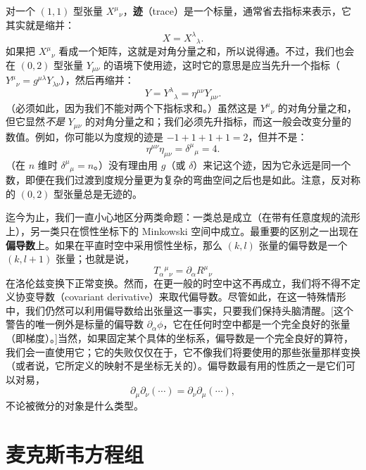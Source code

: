 对一个 $(1,1)$ 型张量 $X^{\mu}{}_{\nu}$，\textbf{迹}（trace）是一个标量，通常省去指标来表示，它其实就是缩并：
\begin{equation*}
X = X^{\lambda}{}_{\lambda}.
\tag{1.87}
\end{equation*}
如果把 $X^{\mu}{}_{\nu}$ 看成一个矩阵，这就是对角分量之和，所以说得通。不过，我们也会在 $(0,2)$ 型张量 $Y_{\mu\nu}$ 的语境下使用迹，这时它的意思是应当先升一个指标（$Y^{\mu}{}_{\nu} = g^{\mu\lambda}Y_{\lambda\nu}$），然后再缩并：
\begin{equation*}
Y = Y^{\lambda}{}_{\lambda} = \eta^{\mu\nu}Y_{\mu\nu}.
\tag{1.88}
\end{equation*}
（必须如此，因为我们不能对两个下指标求和。）虽然这是 $Y^{\mu}{}_{\nu}$ 的对角分量之和，但它显然\emph{不是} $Y_{\mu\nu}$ 的对角分量之和；我们必须先升指标，而这一般会改变分量的数值。例如，你可能以为度规的迹是 $-1+1+1+1=2$，但并不是：
\begin{equation*}
\eta^{\mu\nu}\eta_{\mu\nu} = \delta^{\mu}{}_{\mu} = 4.
\tag{1.89}
\end{equation*}
（在 $n$ 维时 $\delta^{\mu}{}_{\mu}=n$。）没有理由用 $g$（或 $\delta$）来记这个迹，因为它永远是同一个数，即便在我们过渡到度规分量更为复杂的弯曲空间之后也是如此。注意，反对称的 $(0,2)$ 型张量总是无迹的。

迄今为止，我们一直小心地区分两类命题：一类总是成立（在带有任意度规的流形上），另一类只在惯性坐标下的 Minkowski 空间中成立。最重要的区别之一出现在\textbf{偏导数}上。如果在平直时空中采用惯性坐标，那么 $(k,l)$ 张量的偏导数是一个 $(k,l+1)$ 张量；也就是说，
\begin{equation*}
T_{\alpha}{}^{\mu}{}_{\nu} = \partial_{\alpha}R^{\mu}{}_{\nu}
\tag{1.90}
\end{equation*}
在洛伦兹变换下正常变换。然而，在更一般的时空中这不再成立，我们将不得不定义协变导数（covariant derivative）来取代偏导数。尽管如此，在这一特殊情形中，我们仍然可以利用偏导数给出张量这一事实，只要我们保持头脑清醒。[这个警告的唯一例外是标量的偏导数 $\partial_{\alpha}\phi$，它在任何时空中都是一个完全良好的张量（即梯度）。]当然，如果固定某个具体的坐标系，偏导数是一个完全良好的算符，我们会一直使用它；它的失败仅仅在于，它不像我们将要使用的那些张量那样变换（或者说，它所定义的映射不是坐标无关的）。偏导数最有用的性质之一是它们可以对易，
\begin{equation*}
\partial_{\mu}\partial_{\nu}(\cdots) = \partial_{\nu}\partial_{\mu}(\cdots),
\tag{1.91}
\end{equation*}
不论被微分的对象是什么类型。

\section{麦克斯韦方程组}

